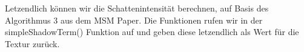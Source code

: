 \documentclass[runningheaders,a4paper]{llncs}
\begin{document}
Letzendlich können wir die Schattenintensität berechnen, auf Basis des Algorithmus 3 aus dem MSM Paper.\cite{msm}
Die Funktionen rufen wir in der simpleShadowTerm() Funktion auf und geben diese letzendlich als Wert für die Textur zurück.
\begin{figure}[H]
	\centering
	

\end{figure}
\end{document}

